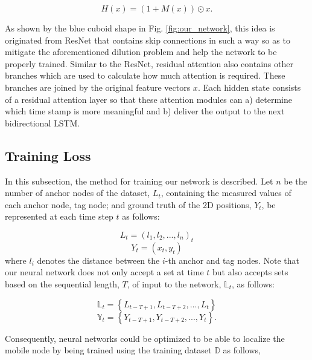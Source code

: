 \documentclass[letterpaper, 10 pt, conference]{ieeeconf}
\begin{document}
\begin{equation}
H(x)=\left(1+M(x)\right)\odot x.
\end{equation} 

As shown by the blue cuboid shape in Fig. \ref{fig:our_network}, this idea is originated from ResNet \cite{he2016deep} that contains skip connections in such a way so as to mitigate the aforementioned dilution problem and help the network to be properly trained. Similar to the ResNet, residual attention also contains other branches which are used to calculate how much attention is required. These branches are joined by the original feature vectors $x$. Each hidden state consists of a residual attention layer so that these attention modules can a) determine which time stamp is more meaningful   and b) deliver the output to the next bidirectional LSTM.

\subsection{Training Loss}

In this subsection, the method for training our network is described. Let $n$ be the number of anchor nodes of the dataset, $L_{t}$, containing the measured values of each anchor node, tag node; and ground truth of the 2D positions, $Y_t$, be represented at each time step $t$ as follows: 

\begin{equation}
L_{t} = (l_{1}, l_{2}, ..., l_{n})_{t}
\end{equation}
\begin{equation}
Y_t = (x_t, y_t)
\end{equation}
where $l_{i}$ denotes the distance between the $i$-th anchor and tag nodes. Note that our neural network does not only accept a set at time $t$ but also accepts sets based on the sequential length, $T$, of input to the network, $\mathbb{L}_t$, as follows:

\begin{equation}
\mathbb{L}_t = \left\{L_{t-T+1}, L_{t-T+2}, ..., L_t\right\} 
\end{equation}
\begin{equation}
\mathbb{Y}_t = \left\{Y_{t-T+1}, Y_{t-T+2}, ..., Y_t\right\}.
\end{equation}

Consequently, neural networks could be optimized to be able to localize the mobile node by being trained using the training dataset $\mathbb{D}$ as follows,  
\end{document}
